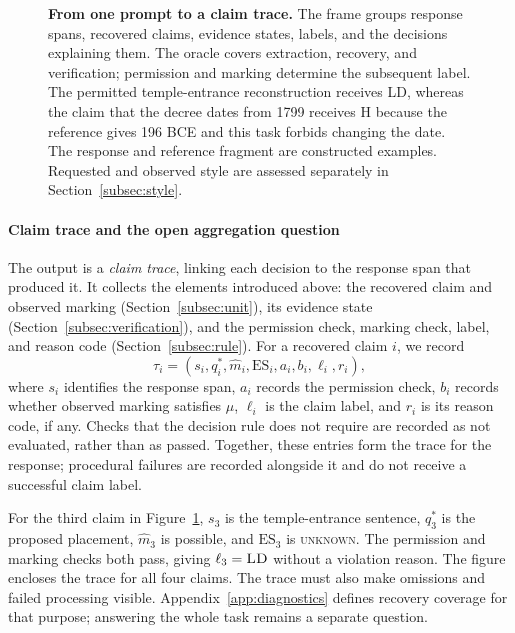 \documentclass{clv2025}
\newcommand{\LD}{\textsc{LD}}
\newcommand{\Hall}{\textsc{H}}
\begin{document}
\begin{figure}[!t]
{}
\caption{\textbf{From one prompt to a claim trace.}
The frame groups response spans, recovered claims, evidence states, labels,
and the decisions explaining them. The oracle covers extraction, recovery,
and verification; permission and marking determine the subsequent label.
The permitted temple-entrance reconstruction receives \LD{}, whereas the
claim that the decree dates from 1799 receives \Hall{} because the
reference gives 196 BCE and this task forbids changing the date.
The response and reference fragment are constructed examples. Requested
and observed style are assessed separately in Section~\ref{subsec:style}.}

\label{fig:claim-label-annotation}
\end{figure}
\FloatBarrier

\paragraph{Claim trace and the open aggregation question}\label{subsec:response}

The output is a \emph{claim trace}, linking each decision to the response
span that produced it. It collects the elements introduced above: the
recovered claim and observed marking (Section~\ref{subsec:unit}), its evidence
state (Section~\ref{subsec:verification}), and the permission check, marking
check, label, and reason code (Section~\ref{subsec:rule}). For a recovered
claim $i$, we record
\begin{equation}
\tau_i=(s_i,q_i^*,\widehat{m}_i,\mathrm{ES}_i,a_i,b_i,\ell_i,r_i),
\label{eq:claim-trace}
\end{equation}
where $s_i$ identifies the response span, $a_i$ records the permission check,
$b_i$ records whether observed marking satisfies $\mu$, $\ell_i$ is the
claim label, and $r_i$ is its reason code, if any. Checks that the decision
rule does not require are recorded as not evaluated, rather than as passed.
Together, these entries form the trace for the response; procedural failures
are recorded alongside it and do not receive a successful claim label.

For the third claim in Figure~\ref{fig:claim-label-annotation}, $s_3$ is the
temple-entrance sentence, $q_3^*$ is the proposed placement,
$\widehat{m}_3$ is possible, and $\mathrm{ES}_3$ is \textsc{unknown}.
The permission and marking checks both pass, giving $\ell_3=\LD$ without
a violation reason. The figure encloses the trace for all four claims.
The trace must also make omissions and failed processing visible.
Appendix~\ref{app:diagnostics} defines recovery coverage for that purpose;
answering the whole task remains a separate question.
\end{document}
